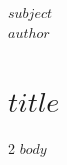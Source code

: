 \documentclass[12pt,letterpaper,twoside]{article}
\begin{document}
\color{OffBlack}


\singlespacing
\thispagestyle{empty}
\begin{flushleft}

\footnotesize{$subject$} \\
\footnotesize{$author$} \\

\vspace{3mm}
\section{$title$} 

\setlength{\columnsep}{3em}
\begin{multicols*}{2}
$body$
\end{multicols*}

\end{flushleft}
\end{document}
